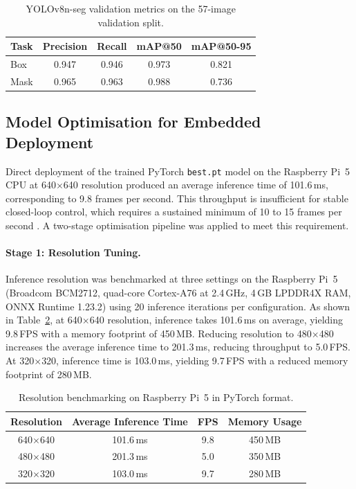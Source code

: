 \begin{table}[tbp]
  \centering
  \caption{YOLOv8n-seg validation metrics on the 57-image validation split.}
  \label{tab:val}
  \begin{tabular}{lcccc}
    \toprule
    Task  & Precision & Recall & mAP@50 & mAP@50-95 \\
    \midrule
    Box   & 0.947     & 0.946  & 0.973  & 0.821 \\
    Mask  & 0.965     & 0.963  & 0.988  & 0.736 \\
    \bottomrule
  \end{tabular}
\end{table}

\subsection{Model Optimisation for Embedded Deployment}
\label{sec:opt}

Direct deployment of the trained PyTorch \texttt{best.pt} model on the
Raspberry Pi~5 CPU at 640$\times$640 resolution produced an average
inference time of 101.6\,ms, corresponding to 9.8 frames per second.
This throughput is insufficient for stable closed-loop control, which
requires a sustained minimum of 10 to 15 frames per second
\cite{r29,r10}. A two-stage optimisation pipeline was applied to meet
this requirement.

\paragraph{Stage 1: Resolution Tuning.}
Inference resolution was benchmarked at three settings on the
Raspberry Pi~5 (Broadcom BCM2712, quad-core Cortex-A76 at 2.4\,GHz,
4\,GB LPDDR4X RAM, ONNX Runtime 1.23.2) using 20 inference iterations
per configuration. As shown in Table~\ref{tab:bench}, at 640$\times$640
resolution, inference takes 101.6\,ms on average, yielding 9.8\,FPS
with a memory footprint of 450\,MB. Reducing resolution to
480$\times$480 increases the average inference time to 201.3\,ms,
reducing throughput to 5.0\,FPS. At 320$\times$320, inference time
is 103.0\,ms, yielding 9.7\,FPS with a reduced memory footprint of
280\,MB.

\begin{table}[tbp]
  \centering
  \caption{Resolution benchmarking on Raspberry Pi~5 in PyTorch format.}
  \label{tab:bench}
  \begin{tabular}{cccc}
    \toprule
    Resolution       & Average Inference Time & FPS & Memory Usage \\
    \midrule
    640$\times$640   & 101.6\,ms              & 9.8 & 450\,MB \\
    480$\times$480   & 201.3\,ms              & 5.0 & 350\,MB \\
    320$\times$320   & 103.0\,ms              & 9.7 & 280\,MB \\
    \bottomrule
  \end{tabular}
\end{table}

